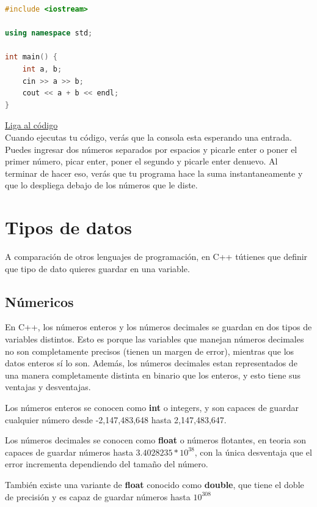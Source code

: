 \documentclass{article}
\begin{document}
\begin{lstlisting}[language=C++, caption=Suma]
#include <iostream>

using namespace std;

int main() {
    int a, b;
    cin >> a >> b;
    cout << a + b << endl;
}
\end{lstlisting}
\href{https://repl.it/@Jamesscn/Suma}{Liga al código}\\

Cuando ejecutas tu código, verás que la consola esta esperando una entrada. Puedes ingresar dos números separados por espacios y picarle enter o poner el primer número, picar enter, poner el segundo y picarle enter denuevo. Al terminar de hacer eso, verás que tu programa hace la suma instantaneamente y que lo despliega debajo de los números que le diste.

\section{Tipos de datos}

A comparación de otros lenguajes de programación, en C++ tútienes que definir que tipo de dato quieres guardar en una variable.

\subsection{Númericos}

En C++, los números enteros y los números decimales se guardan en dos tipos de variables distintos. Esto es porque las variables que manejan números decimales no son completamente precisos (tienen un margen de error), mientras que los datos enteros sí lo son. Además, los números decimales estan representados de una manera completamente distinta en binario que los enteros, y esto tiene sus ventajas y desventajas.

Los números enteros se conocen como \textbf{int} o integers, y son capaces de guardar cualquier número desde -2,147,483,648 hasta 2,147,483,647.

Los números decimales se conocen como \textbf{float} o números flotantes, en teoria son capaces de guardar números hasta $3.4028235*10^{38}$, con la única desventaja que el error incrementa dependiendo del tamaño del número.

También existe una variante de \textbf{float} conocido como \textbf{double}, que tiene el doble de precisión y es capaz de guardar números hasta $10^{308}$
\end{document}
